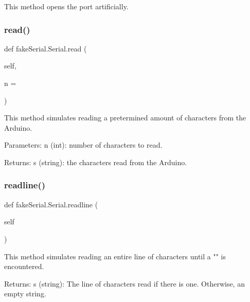 \begin{DoxyVerb}This method opens the port artificially.
\end{DoxyVerb}
 \mbox{\label{classfake_serial_1_1_serial_a46f1021e19572ff944e886e53a51a1d1}} 
\subsubsection{\texorpdfstring{read()}{read()}}
{\footnotesize\ttfamily def fake\+Serial.\+Serial.\+read (\begin{DoxyParamCaption}\item[{}]{self,  }\item[{}]{n = {} }\end{DoxyParamCaption})}

\begin{DoxyVerb}This method simulates reading a pretermined amount of characters from the Arduino.

Parameters:
    n (int): number of characters to read.

Returns:
    s (string): the characters read from the Arduino.
\end{DoxyVerb}
 \mbox{\label{classfake_serial_1_1_serial_a58f35303f074c25e972c0b16c6382bf4}} 
\subsubsection{\texorpdfstring{readline()}{readline()}}
{\footnotesize\ttfamily def fake\+Serial.\+Serial.\+readline (\begin{DoxyParamCaption}\item[{}]{self }\end{DoxyParamCaption})}

\begin{DoxyVerb}This method simulates reading an entire line of characters until a "\n" is encountered.

Returns:
    s (string): The line of characters read if there is one. Otherwise, an empty string.
\end{DoxyVerb}
 \mbox{\label{classfake_serial_1_1_serial_abc4ef915d782f9e4a8d1d6f398298a6d}} 
